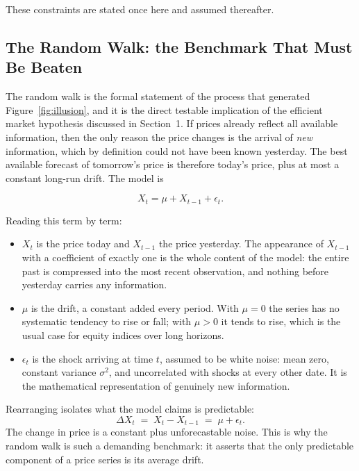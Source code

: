 \documentclass[12pt,a4paper]{article}
\begin{document}
These constraints are stated once here and assumed thereafter.

\subsection{The Random Walk: the Benchmark That Must Be Beaten}

The random walk is the formal statement of the process that generated
Figure~\ref{fig:illusion}, and it is the direct testable implication of the
efficient market hypothesis discussed in Section~1. If prices already reflect
all available information, then the only reason the price changes is the
arrival of \emph{new} information, which by definition could not have been
known yesterday. The best available forecast of tomorrow's price is therefore
today's price, plus at most a constant long-run drift. The model is

\begin{equation}
X_t = \mu + X_{t-1} + \epsilon_t .
\end{equation}

Reading this term by term:
\begin{itemize}
\item $X_t$ is the price today and $X_{t-1}$ the price yesterday. The
      appearance of $X_{t-1}$ with a coefficient of exactly one is the whole
      content of the model: the entire past is compressed into the most recent
      observation, and nothing before yesterday carries any information.
\item $\mu$ is the drift, a constant added every period. With $\mu = 0$ the
      series has no systematic tendency to rise or fall; with $\mu > 0$ it
      tends to rise, which is the usual case for equity indices over long
      horizons.
\item $\epsilon_t$ is the shock arriving at time $t$, assumed to be white
      noise: mean zero, constant variance $\sigma^2$, and uncorrelated with
      shocks at every other date. It is the mathematical representation of
      genuinely new information.
\end{itemize}

Rearranging isolates what the model claims is predictable:
\begin{equation}
\Delta X_t \;=\; X_t - X_{t-1} \;=\; \mu + \epsilon_t .
\end{equation}
The change in price is a constant plus unforecastable noise. This is why the
random walk is such a demanding benchmark: it asserts that the only
predictable component of a price series is its average drift.
\end{document}
